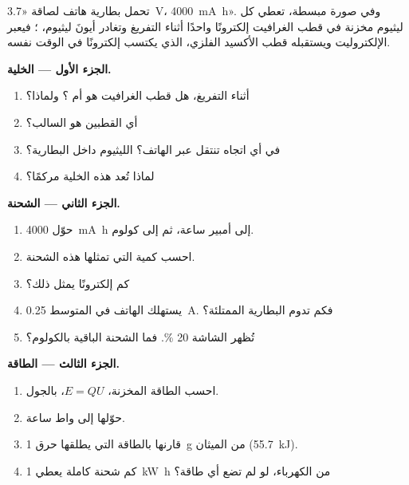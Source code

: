 \begin{problem}
\label{pb:g12:cells-and-electrolysis:1}
تحمل بطارية هاتف لصاقة «\qty{3.7}{V}، \qty{4000}{mA.h}». وفي صورة
مبسطة، تعطي كل  ليثيوم مخزنة في قطب الغرافيت إلكترونًا واحدًا أثناء
التفريغ وتغادر أيونَ ليثيوم،
؛ فيعبر  الإلكتروليت ويستقبله
قطب الأكسيد الفلزي، الذي يكتسب إلكترونًا في الوقت نفسه.

\medskip
\noindent\textbf{الجزء الأول --- الخلية.}
\begin{enumerate}
  \item أثناء التفريغ، هل قطب الغرافيت هو  أم
        ؟ ولماذا؟
  \item أي القطبين هو السالب؟
  \item في أي اتجاه تنتقل  عبر الهاتف؟
         الليثيوم داخل البطارية؟
  \item لماذا تُعد هذه الخلية مركمًا؟
\end{enumerate}

\medskip
\noindent\textbf{الجزء الثاني --- الشحنة.}
\begin{enumerate}[resume]
  \item حوّل \qty{4000}{mA.h} إلى أمبير ساعة، ثم إلى كولوم.
  \item احسب كمية  التي تمثلها هذه الشحنة.
  \item كم إلكترونًا يمثل ذلك؟
  \item يستهلك الهاتف في المتوسط \qty{0.25}{A}. فكم تدوم
        البطارية الممتلئة؟
  \item تُظهر الشاشة 20 \%. فما الشحنة الباقية بالكولوم؟
\end{enumerate}

\medskip
\noindent\textbf{الجزء الثالث --- الطاقة.}
\begin{enumerate}[resume]
  \item احسب الطاقة المخزنة، $E = Q U$، بالجول.
  \item حوّلها إلى واط ساعة.
  \item قارنها بالطاقة التي يطلقها حرق \qty{1}{g} من الميثان
        (\qty{55.7}{kJ}).
  \item كم شحنة كاملة يعطي \qty{1}{kW.h} من الكهرباء، لو
        لم تضع أي طاقة؟
\end{enumerate}


\end{problem}
